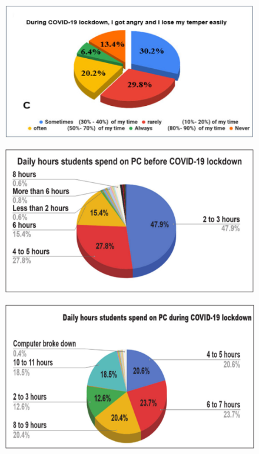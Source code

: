 \documentclass[11pt]{scrartcl}
\begin{document}
	\begin{figure}[H]
		\centering
		\includegraphics[scale=0.6]{pic5}
	\end{figure}

	\begin{figure}[H]
		\centering
		\includegraphics[scale=0.6]{pic6}
	\end{figure}

	\begin{figure}[H]
		\centering
		\includegraphics[scale=0.6]{pic7}
	\end{figure}
\end{document}
